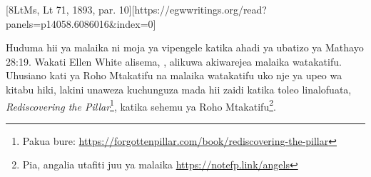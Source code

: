 [8LtMs, Lt 71, 1893, par. 10][https://egwwritings.org/read?panels=p14058.6086016&index=0]


Huduma hii ya malaika ni moja ya vipengele katika ahadi ya ubatizo ya Mathayo 28:19. Wakati Ellen White alisema, , alikuwa akiwarejea malaika watakatifu. Uhusiano kati ya Roho Mtakatifu na malaika watakatifu uko nje ya upeo wa kitabu hiki, lakini unaweza kuchunguza mada hii zaidi katika toleo linalofuata, \textit{Rediscovering the Pillar}\footnote{Pakua bure: \href{https://forgottenpillar.com/book/rediscovering-the-pillar}{https://forgottenpillar.com/book/rediscovering-the-pillar}}, katika sehemu ya Roho Mtakatifu\footnote{Pia, angalia utafiti juu ya malaika \href{https://notefp.link/angels}{https://notefp.link/angels}}.





